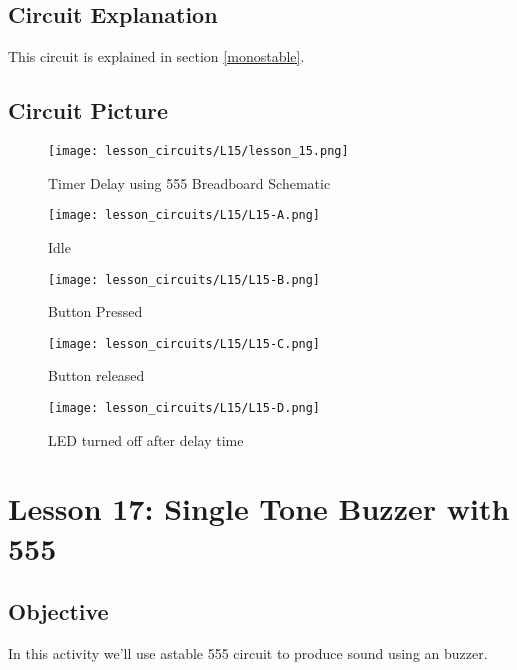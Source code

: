 \subsection{Circuit Explanation}
This circuit is explained in section \ref{monostable}.
\subsection{Circuit Picture}
\begin{figure}[!htp]
    \centering
    \texttt{[image: lesson\_circuits/L15/lesson\_15.png]}
    \caption{Timer Delay using 555 Breadboard Schematic}
    \label{fig:555_timer_sch}
\end{figure}
\begin{figure}[!htp]
    \centering
    \texttt{[image: lesson\_circuits/L15/L15-A.png]}
    \caption{Idle}
    \label{fig:555_timer_obb}
\end{figure}
\begin{figure}[!htp]
    \centering
    \texttt{[image: lesson\_circuits/L15/L15-B.png]}
    \caption{Button Pressed}
    \label{fig:555_timer_obb1}
\end{figure}
\begin{figure}[!htp]
    \centering
    \texttt{[image: lesson\_circuits/L15/L15-C.png]}
    \caption{Button released}
    \label{fig:555_timer_obb2}
\end{figure}
\begin{figure}[!htp]
    \centering
    \texttt{[image: lesson\_circuits/L15/L15-D.png]}
    \caption{LED turned off after delay time}
    \label{fig:555_timer_obb3}
\end{figure}
\clearpage
\section{Lesson 17: Single Tone Buzzer with 555}
\subsection{Objective}
In this activity we'll use astable 555 circuit to produce sound using an buzzer.
